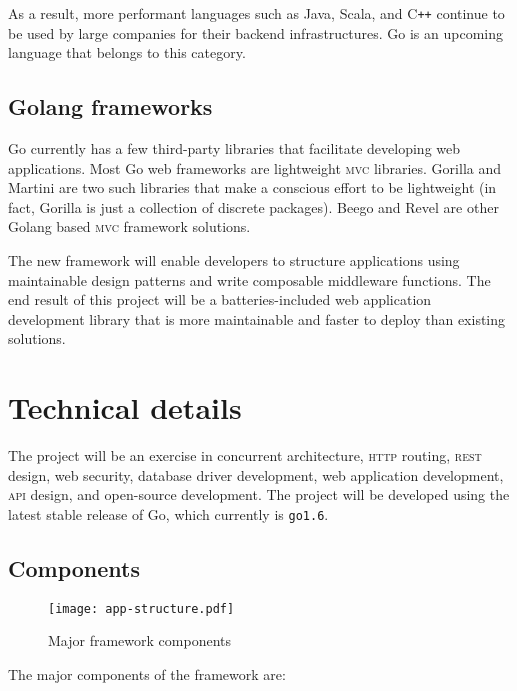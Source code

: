 \documentclass{article}
\begin{document}
As a result, more performant languages such as Java, Scala, and C\texttt{++} continue to be used by large companies for their backend infrastructures. Go is an upcoming language that belongs to this category.

\subsection{Golang frameworks}

Go currently has a few third-party libraries that facilitate developing web applications. Most Go web frameworks are lightweight \textsc{mvc} libraries. Gorilla and Martini are two such libraries that make a conscious effort to be lightweight (in fact, Gorilla is just a collection of discrete packages). Beego and Revel are other Golang based \textsc{mvc} framework solutions. 

The new framework will enable developers to structure applications using maintainable design patterns and write composable middleware functions. The end result of this project will be a batteries-included web application development library that is more maintainable and faster to deploy than existing solutions.

\section{Technical details}

The project will be an exercise in concurrent architecture, \textsc{http} routing, \textsc{rest} design, web security, database driver development, web application development, \textsc{api} design, and open-source development. The project will be developed using the latest stable release of Go, which currently is \texttt{go1.6}. 

\subsection{Components}

\begin{figure}[h]
\centering
\texttt{[image: app-structure.pdf]}
\caption{Major framework components}
\end{figure}

The major components of the framework are:
\end{document}
